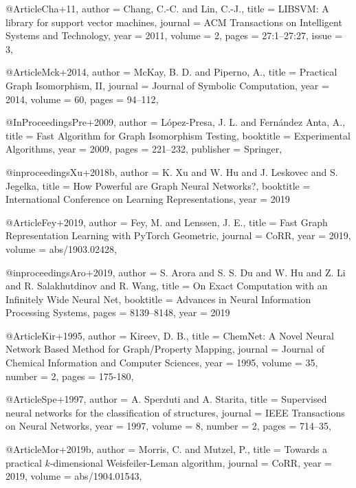 @Article{Cha+11,
  author  = {Chang, C.-C. and Lin, C.-J.},
  title   = {{{LIBSVM}}: {A} library for support vector machines},
  journal = {ACM Transactions on Intelligent Systems and Technology},
  year    = {2011},
  volume  = {2},
  pages   = {27:1--27:27},
  issue   = {3},
}

@Article{Mck+2014,
  author  = {McKay, B. D. and Piperno, A.},
  title   = {Practical Graph Isomorphism, II},
  journal = {Journal of Symbolic Computation},
  year    = {2014},
  volume  = {60},
  pages   = {94--112},
}

@InProceedings{Pre+2009,
  author    = {L{\'o}pez-Presa, J. L. and Fern{\'a}ndez Anta, A.},
  title     = {Fast Algorithm for Graph Isomorphism Testing},
  booktitle = {Experimental Algorithms},
  year      = {2009},
  pages     = {221--232},
  publisher = {Springer},
}

@inproceedings{Xu+2018b,
author    = {K. Xu and
W. Hu and
J. Leskovec and
S. Jegelka},
title     = {How Powerful are Graph Neural Networks?},
booktitle = {International Conference on Learning Representations},
year      = {2019}
}

@Article{Fey+2019,
  author  = {Fey, M. and Lenssen, J. E.},
  title   = {Fast Graph Representation Learning with {PyTorch Geometric}},
  journal = {CoRR},
  year    = {2019},
  volume  = {abs/1903.02428},
}

@inproceedings{Aro+2019,
	author    = {S. Arora and
	S. S. Du and
	W. Hu and
	Z. Li and
	R. Salakhutdinov and
	R. Wang},
	title     = {On Exact Computation with an Infinitely Wide Neural Net},
	booktitle = {Advances in Neural Information Processing Systems},
	pages     = {8139--8148},
	year      = {2019}
}

@Article{Kir+1995,
  author  = {Kireev, D. B.},
  title   = {ChemNet: A Novel Neural Network Based Method for Graph/Property Mapping},
  journal = {Journal of Chemical Information and Computer Sciences},
  year    = {1995},
  volume  = {35},
  number  = {2},
  pages   = {175-180},
}

@Article{Spe+1997,
  author  = {A. Sperduti and A. Starita},
  title   = {Supervised neural networks for the classification of structures},
  journal = {IEEE Transactions on Neural Networks},
  year    = {1997},
  volume  = {8},
  number  = {2},
  pages   = {714--35},
}

@Article{Mor+2019b,
  author  = {Morris, C. and Mutzel, P.},
  title   = {Towards a practical $k$-dimensional {Weisfeiler-Leman} algorithm},
  journal = {CoRR},
  year    = {2019},
  volume  = {abs/1904.01543},
}


